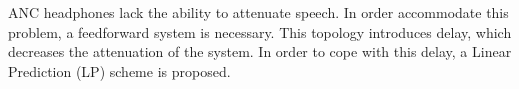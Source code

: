 \large

%
%
%
%
%
%




ANC headphones lack the ability to attenuate speech.
In order accommodate this problem, a feedforward system is necessary.
This topology introduces delay, which decreases the attenuation of the system.
In order to cope with this delay, a Linear Prediction (LP) scheme is proposed.


 











